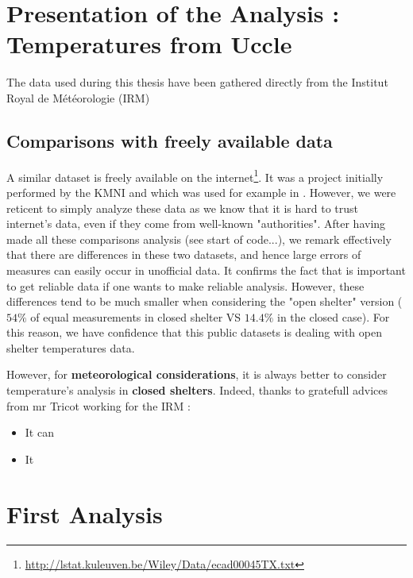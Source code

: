 \documentclass[11pt,a4paper,openany ]{book}
\begin{document}
\section{Presentation of the Analysis : Temperatures from Uccle}

The data used during this thesis have been gathered directly from the Institut Royal de Météorologie (IRM) 

\subsection{Comparisons with freely available data} 

A similar dataset is freely available on the internet\footnote{\url{http://lstat.kuleuven.be/Wiley/Data/ecad00045TX.txt}}. It was a project initially performed by the KMNI and which was used for example in \citet{beirlant_statistics_2006}. However, we were reticent to simply analyze these data as we know that it is hard to trust internet's data, even if they come from well-known "authorities". After having made all these comparisons analysis (see start of code...), we remark effectively that there are differences
in these two datasets, and hence large errors of measures can easily occur 
in unofficial data. It confirms the fact that is important to get reliable data if one wants to make reliable analysis. 
However, these differences tend to be much smaller when considering the "open shelter"
version ($54\%$ of equal measurements in closed shelter VS $14.4\%$ in the closed case). For this reason, we have confidence that this public datasets
is dealing with open shelter temperatures data.

However, for\textbf{ meteorological considerations}, it is always better to consider temperature's analysis in \textbf{closed shelters}. Indeed, thanks to gratefull advices from mr Tricot working for the IRM : 
\begin{itemize}
	\item It can
	\item It
\end{itemize}






\section{First Analysis}
\end{document}
